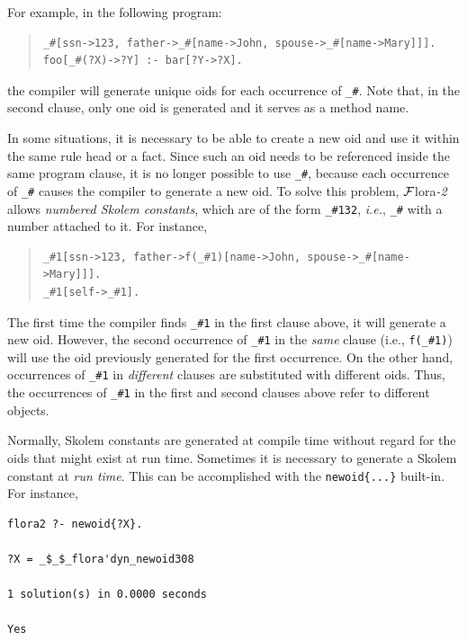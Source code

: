 \documentclass[11pt]{article}
\newcommand{\FLORA}{{\mbox{\sc ${\cal F}${lora}\rm\emph{-2}}}\xspace}
\begin{document}
For example, in the following program:
\begin{quote}
\begin{verbatim}
_#[ssn->123, father->_#[name->John, spouse->_#[name->Mary]]].
foo[_#(?X)->?Y] :- bar[?Y->?X].
\end{verbatim}
\end{quote}
the compiler will generate unique oids for each occurrence of {\tt \_\#}.
Note that, in the second clause, only one oid is generated and it serves as
a method name.

In some situations, it is necessary to be able to create a new oid and use it
within the same rule head or a fact. Since such an oid 
needs to be referenced inside the same program clause, it is no longer
possible to use \verb|_#|, because each occurrence of \verb|_#| causes the
compiler to generate a new oid. To solve this problem, \FLORA allows 
\emph{numbered Skolem constants}, which are of the form \verb|_#132|, {\it
  i.e.}, \verb|_#| with a number attached to it. For instance, 
\begin{quote}
\begin{verbatim}
_#1[ssn->123, father->f(_#1)[name->John, spouse->_#[name->Mary]]].
_#1[self->_#1].
\end{verbatim}
\end{quote}
The first time the compiler finds \verb|_#1| in the first clause above,
it will generate a new oid. However, the second occurrence of \verb|_#1|
in the \emph{same} clause (i.e., \verb|f(_#1)|)  will use the oid
previously generated for the first occurrence. On the other hand,
occurrences of \verb|_#1| in \emph{different} clauses are substituted with
different oids. Thus, the occurrences of \verb|_#1| in the first and second
clauses above refer to different objects.

Normally,
Skolem constants are generated at compile time without regard for the oids
that might exist at run time. Sometimes it is necessary to generate a
Skolem constant at \emph{run time}. This can be accomplished with the
{\tt newoid\{...\}} built-in. For instance, 
\begin{verbatim}
flora2 ?- newoid{?X}.
 
?X = _$_$_flora'dyn_newoid308
 
1 solution(s) in 0.0000 seconds 
 
Yes
\end{verbatim}
\end{document}
